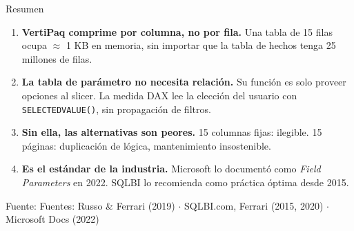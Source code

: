 \documentclass[aspectratio=169,10pt]{beamer}
\newcommand{\src}[1]{{\tiny\color{gray}Fuente: #1}}
\begin{document}
\begin{frame}{Resumen}

\begin{enumerate}\setlength\itemsep{0.6em}

  \item \textbf{VertiPaq comprime por columna, no por fila.}
    Una tabla de 15 filas ocupa $\approx$ 1 KB en memoria,
    sin importar que la tabla de hechos tenga 25 millones de filas.

  \item \textbf{La tabla de par\'ametro no necesita relaci\'on.}
    Su funci\'on es solo proveer opciones al slicer.
    La medida DAX lee la elecci\'on del usuario con
    \texttt{SELECTEDVALUE()}, sin propagaci\'on de filtros.

  \item \textbf{Sin ella, las alternativas son peores.}
    15 columnas fijas: ilegible.
    15 p\'aginas: duplicaci\'on de l\'ogica, mantenimiento insostenible.

  \item \textbf{Es el est\'andar de la industria.}
    Microsoft lo document\'o como \textit{Field Parameters} en 2022.
    SQLBI lo recomienda como pr\'actica \'optima desde 2015.

\end{enumerate}

\bigskip
\begin{center}
\src{Fuentes: Russo \& Ferrari (2019) $\cdot$
SQLBI.com, Ferrari (2015, 2020) $\cdot$
Microsoft Docs (2022)}
\end{center}

\end{frame}
\end{document}
